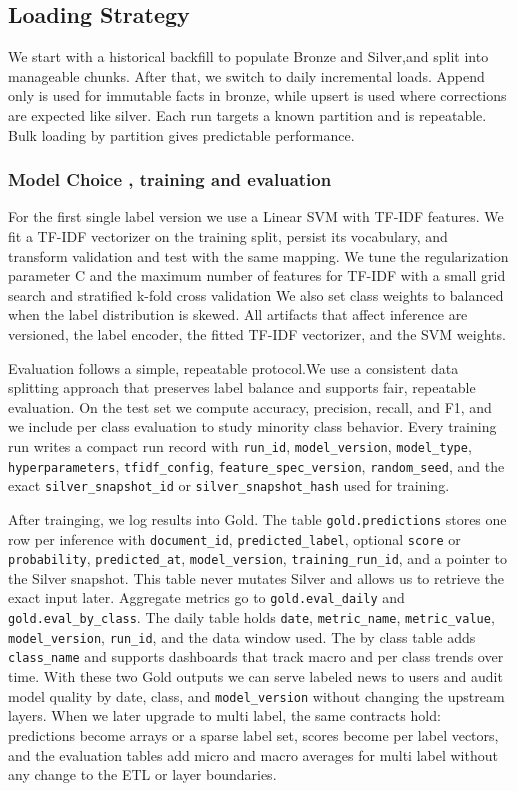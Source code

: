 \subsection{Loading Strategy}
We start with a historical backfill to populate Bronze and Silver,and split into manageable chunks. After that, we switch to daily incremental loads. Append only is used for immutable facts in bronze, while upsert is used where corrections are expected like silver. Each run targets a known partition and is repeatable. Bulk loading by partition gives predictable performance.


\subsubsection{Model Choice , training and evaluation}
For the first single label version we use a Linear SVM with TF-IDF features. We fit a TF-IDF vectorizer on the training split, persist its vocabulary, and transform validation and test with the same mapping. We tune the regularization parameter C and the maximum number of features for TF-IDF with a small grid search and stratified k-fold cross validation  We also set class weights to balanced when the label distribution is skewed. All artifacts that affect inference are versioned, the label encoder, the fitted TF-IDF vectorizer, and the SVM weights.

\smallbreak
Evaluation follows a simple, repeatable protocol.We use a consistent data splitting approach that preserves label balance and supports fair, repeatable evaluation. On the test set we compute accuracy,  precision,  recall, and  F1, and we include per class evaluation to study minority class behavior.
Every training run writes a compact run record with \texttt{run\_id}, \texttt{model\_version}, \texttt{model\_type}, \texttt{hyperparameters}, \texttt{tfidf\_config}, \texttt{feature\_spec\_version}, \texttt{random\_seed}, and the exact \texttt{silver\_snapshot\_id} or \texttt{silver\_snapshot\_hash} used for training.
\smallbreak



After trainging, we log results into Gold. The table \texttt{gold.predictions} stores one row per inference with \texttt{document\_id}, \texttt{predicted\_label}, optional \texttt{score} or \texttt{probability}, \texttt{predicted\_at}, \texttt{model\_version}, \texttt{training\_run\_id}, and a pointer to the Silver snapshot. This table never mutates Silver and allows us to retrieve the exact input later. Aggregate metrics go to \texttt{gold.eval\_daily} and \texttt{gold.eval\_by\_class}. The daily table holds \texttt{date}, \texttt{metric\_name}, \texttt{metric\_value}, \texttt{model\_version}, \texttt{run\_id}, and the data window used. The by class table adds \texttt{class\_name} and supports dashboards that track macro and per class trends over time. With these two Gold outputs we can serve labeled news to users and audit model quality by date, class, and \texttt{model\_version} without changing the upstream layers. When we later upgrade to multi label, the same contracts hold: predictions become arrays or a sparse label set, scores become per label vectors, and the evaluation tables add micro and macro averages for multi label without any change to the ETL or layer boundaries.

